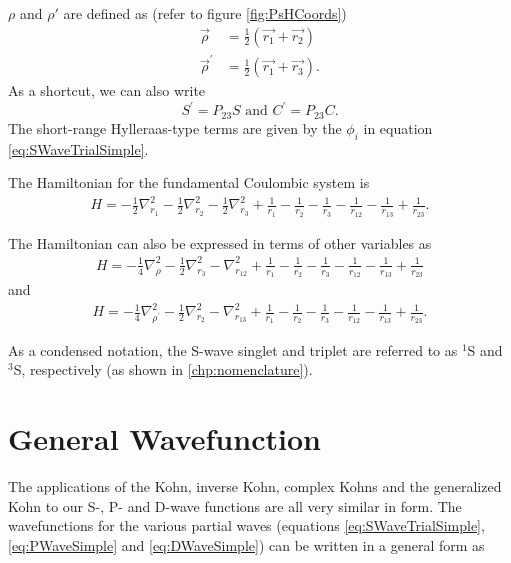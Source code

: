 \documentclass[Dissertation.tex]{subfiles}
\begin{document}
$\rho$ and $\rho'$ are defined as (refer to figure \ref{fig:PsHCoords})
\begin{subequations}
\begin{align}
\vec{\rho} &= \frac{1}{2}\left(\vec{r_1} + \vec{r_2}\right) \label{eq:RhoDef}\\
\vec{\rho}^\prime &= \frac{1}{2}\left(\vec{r_1} + \vec{r_3}\right) \label{eq:RhopDef}.
\end{align}
\end{subequations}
As a shortcut, we can also write
\begin{equation}
S^\prime = P_{23} S \text{ and } C^\prime = P_{23} C.
\label{eq:SCprime}
\end{equation}
The short-range Hylleraas-type terms are given by the $\phi_i$ in equation \ref{eq:SWaveTrialSimple}. 

The Hamiltonian for the fundamental Coulombic system is
\begin{align}
\label{eq:Hamiltonian1}
H = -\frac{1}{2} \nabla_{r_1}^2 - \frac{1}{2} \nabla_{r_2}^2 - \frac{1}{2} \nabla_{r_3}^2 + \frac{1}{r_1} - \frac{1}{r_2} - \frac{1}{r_3} - \frac{1}{r_{12}} -\frac {1}{r_{13}} + \frac{1}{r_{23}}.
\end{align}

\noindent The Hamiltonian can also be expressed in terms of other variables as
\begin{align}
H = -\frac{1}{4} \nabla_{\rho}^2 - \frac{1}{2} \nabla_{r_3}^2 - \nabla_{r_{12}}^2 + \frac{1}{r_1} - \frac{1}{r_2} - \frac{1}{r_3} - \frac{1}{r_{12}} - \frac{1}{r_{13}} + \frac{1}{r_{23}}
\label{eq:Hamiltonian2}
\end{align}
and
\begin{align}
H = -\frac{1}{4} \nabla_{\rho^\prime}^2 - \frac{1}{2} \nabla_{r_2}^2 - \nabla_{r_{13}}^2 + \frac{1}{r_1} - \frac{1}{r_2} - \frac{1}{r_3} - \frac{1}{r_{12}} - \frac{1}{r_{13}} + \frac{1}{r_{23}}.
\label{eq:Hamiltonian3}
\end{align}

As a condensed notation, the S-wave singlet and triplet are referred to as $^1$S and $^3$S, respectively (as shown in \cref{chp:nomenclature}).

\section{General Wavefunction}

The applications of the Kohn, inverse Kohn, complex Kohns and the generalized Kohn to our S-, P- and D-wave functions are all very similar in form. The wavefunctions for the various partial waves (equations \ref{eq:SWaveTrialSimple}, \ref{eq:PWaveSimple} and \ref{eq:DWaveSimple}) can be written in a general form as
\end{document}
